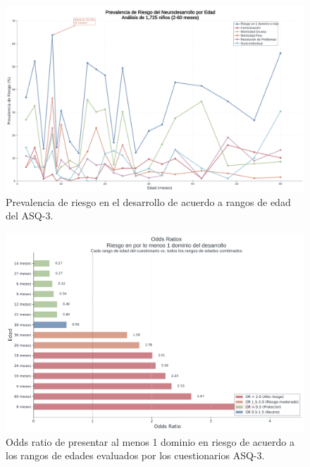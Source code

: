 \documentclass[11pt,letterpaper]{report}
\begin{document}
\begin{figure}[htbp]
    \centering
    \includegraphics[width=1\textwidth]{prevalencia_edad_nord}
	\captionsetup{font=footnotesize}
	\caption{Prevalencia de riesgo en el desarrollo de acuerdo a rangos de edad
	del ASQ-3.}
    \label{fig:prevalencia_riesgo_asq3}
\end{figure}

\begin{figure}[htbp]
    \centering
    \includegraphics[width=1\textwidth]{odds_ratios_nord}
	\captionsetup{font=footnotesize}
	\caption{Odds ratio de presentar al menos 1 dominio en riesgo de acuerdo a
	los rangos de edades evaluados por los cuestionarios ASQ-3.}
    \label{fig:odds_ratio_asq3}
\end{figure}
\end{document}
